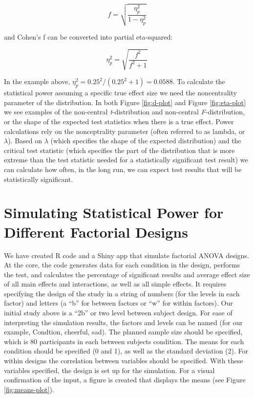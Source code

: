\documentclass[,man,floatsintext]{apa6}
\begin{document}
\begin{equation}
f = \sqrt{\frac{\eta_p^2}{1-\eta_p^2}}
\end{equation}

and Cohen's f can be converted into partial eta-squared:

\begin{equation}
\eta_p^2 = \sqrt{\frac{f^2}{f^2+1}}
\end{equation}

In the example above, \(\eta_p^2 = 0.25^2/(0.25^2+1) = 0.0588\). To
calculate the statistical power assuming a specific true effect size we
need the noncentrality parameter of the distribution. In both Figure
\ref{fig:d-plot} and Figure \ref{fig:eta-plot} we see examples of the
non-central \emph{t}-distribution and non-central \emph{F}-distribution,
or the shape of the expected test statistics when there is a true
effect. Power calculations rely on the nonceptrality parameter (often
referred to as lambda, or \(\lambda\)). Based on \(\lambda\) (which
specifies the shape of the expected distribution) and the critical test
statistic (which specifies the part of the distribution that is more
extreme than the test statistic needed for a statistically significant
test result) we can calculate how often, in the long run, we can expect
test results that will be statistically significant.

\section{Simulating Statistical Power for Different Factorial
Designs}\label{simulating-statistical-power-for-different-factorial-designs}

We have created R code and a Shiny app that simulate factorial ANOVA
designs. At the core, the code generates data for each condition in the
design, performs the test, and calculates the percentage of significant
results and average effect size of all main effects and interactions, as
well as all simple effects. It requires specifying the design of the
study in a string of numbers (for the levels in each factor) and letters
(a \enquote{b} for between factors or \enquote{w} for within factors).
Our initial study above is a \enquote{2b} or two level between subject
design. For ease of interpreting the simulation results, the factors and
levels can be named (for our example, Condtion, cheerful, sad). The
planned sample size should be specified, which is 80 participants in
each between subjects condition. The means for each condition should be
specified (0 and 1), as well as the standard deviation (2). For within
designs the correlation between variables should be specified. With
these variables specified, the design is set up for the simulation. For
a visual confirmation of the input, a figure is created that displays
the means (see Figure \ref{fig:means-plot}).
\end{document}
